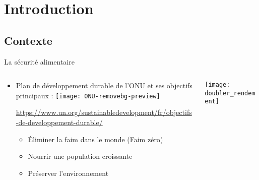 


\section{Introduction}
\subsection{Contexte}




\begin{frame}{La sécurité alimentaire } 

\begin{columns}

 \begin{column}{.65\textwidth}
  \begin{outline}
\begin{itemize}[itemsep=10pt]
\item {Plan de développement durable de l'ONU et ses  objectifs principaux : \hspace{15mm} \texttt{[image: ONU-removebg-preview]}}
\vspace{-4mm}
               \begin{flushleft}
             \textcolor{myblue1}{{\tiny\href{https://www.un.org/sustainabledevelopment/fr/objectifs-de-developpement-durable/}{https://www.un.org/sustainabledevelopment/fr/objectifs-de-developpement-durable/}}}  
\end{flushleft}  

        \begin{itemize}[itemsep=8pt,label=$\rightarrow$]
      \item{ Éliminer la faim dans le monde ({\small Faim zéro}) }   
 \item Nourrir une population croissante
              \item Préserver l'environnement%
\end{itemize}
\end{itemize}
\end{outline} 
 \end{column}

 \begin{column}{.4\textwidth} 
 \vspace{14mm}
            \texttt{[image: doubler\_rendement]}         
 \end{column}
       


\end{columns}
\end{frame}
